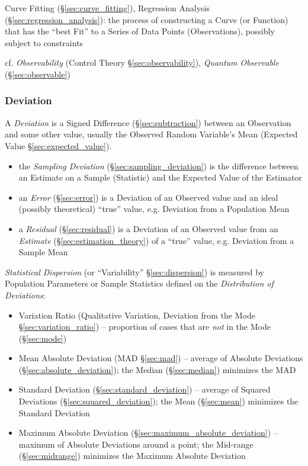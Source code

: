 \fist Curve Fitting (\S\ref{sec:curve_fitting}), Regression Analysis
(\S\ref{sec:regression_analysis}): the process of constructing a Curve (or
Function) that has the ``best Fit'' to a Series of Data Points (Observations),
possibly subject to constraints

\fist cf. \emph{Observability} (Control Theory \S\ref{sec:observability}),
\emph{Quantum Observable} (\S\ref{sec:observable})



\subsubsection{Deviation}\label{sec:deviation}

A \emph{Deviation} is a Signed Difference (\S\ref{sec:subtraction}) between an
Observation and some other value, usually the Observed Random Variable's Mean
(Expected Value \S\ref{sec:expected_value}).

\begin{itemize}
  \item the \emph{Sampling Deviation} (\S\ref{sec:sampling_deviation}) is the
    difference between an Estimate on a Sample (Statistic) and the Expected
    Value of the Estimator
  \item an \emph{Error} (\S\ref{sec:error}) is a Deviation of an Observed value
    and an ideal (possibly theoretical) ``true'' value, e.g. Deviation from a
    Population Mean
  \item a \emph{Residual} (\S\ref{sec:residual}) is a Deviation of an Observed
    value from an \emph{Estimate} (\S\ref{sec:estimation_theory}) of a ``true''
    value, e.g. Deviation from a Sample Mean
\end{itemize}

\emph{Statistical Dispersion} (or ``Variability'' \S\ref{sec:dispersion}) is
measured by Population Parameters or Sample Statistics defined on the
\emph{Distribution of Deviations}:
\begin{itemize}
  \item Variation Ratio (Qualitative Variation, Deviation from the Mode
    \S\ref{sec:variation_ratio}) -- proportion of cases that are \emph{not} in
    the Mode (\S\ref{sec:mode})
  \item Mean Absolute Deviation (MAD \S\ref{sec:mad}) -- average of Absolute
    Deviations (\S\ref{sec:absolute_deviation}); the Median (\S\ref{sec:median})
    minimizes the MAD
  \item Standard Deviation (\S\ref{sec:standard_deviation}) -- average of
    Squared Deviations (\S\ref{sec:squared_deviation}); the Mean
    (\S\ref{sec:mean}) minimizes the Standard Deviation
  \item Maximum Absolute Deviation (\S\ref{sec:maximum_absolute_deviation}) --
    maximum of Absolute Deviations around a point; the Mid-range
    (\S\ref{sec:midrange}) minimizes the Maximum Absolute Deviation
\end{itemize}

